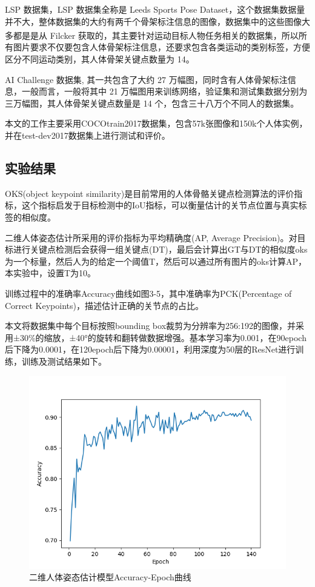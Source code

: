 LSP 数据集，LSP 数据集全称是 Leeds Sports Pose Dataset，这个数据集数据量并不大，整体数据集的大约有两千个骨架标注信息的图像，数据集中的这些图像大多都是是从 Filcker 获取的\textsuperscript{\cite{p17}}，其主要针对运动目标人物任务相关的数据集，所以所有图片要求不仅要包含人体骨架标注信息，还要求包含各类运动的类别标签，方便区分不同运动类别，其人体骨架关键点数量为 14。

AI Challenge 数据集, 其一共包含了大约 27 万幅图，同时含有人体骨架标注信息，一般而言，一般将其中 21 万幅图用来训练网络，验证集和测试集数据分别为三万幅图，其人体骨架关键点数量是 14 个，包含三十八万个不同人的数据集。

本文的工作主要采用COCOtrain2017数据集，包含57k张图像和150k个人体实例，并在test-dev2017数据集上进行测试和评价。

\subsection{实验结果}{}
OKS(object keypoint similarity)是目前常用的人体骨骼关键点检测算法的评价指标，这个指标启发于目标检测中的IoU指标，可以衡量估计的关节点位置与真实标签的相似度。

二维人体姿态估计所采用的评价指标为平均精确度(AP, Average Precision)。对目标进行关键点检测后会获得一组关键点(DT)，最后会计算出GT与DT的相似度oks为一个标量，然后人为的给定一个阈值T，然后可以通过所有图片的oks计算AP，本实验中，设置T为10。

训练过程中的准确率Accuracy曲线如图3-5，其中准确率为PCK(Percentage of Correct Keypoints)，描述估计正确的关节点的占比。

本文将数据集中每个目标按照bounding box裁剪为分辨率为256:192的图像，并采用±30\%的缩放，±40°的旋转和翻转做数据增强。基本学习率为0.001，在90epoch后下降为0.0001，在120epoch后下降为0.00001，利用深度为50层的ResNet进行训练，训练及测试结果如下。

\begin{figure}[h]
	\centering
	\includegraphics[scale=0.8]{figures/20.png}
	\caption{二维人体姿态估计模型Accuracy-Epoch曲线}
	\label{fig:f20}
\end{figure}

